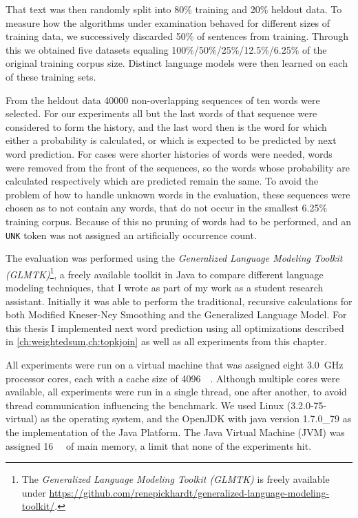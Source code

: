 That text was then randomly split into 80\% training and 20\% heldout data.
To measure how the algorithms under examination behaved for different sizes
of training data, we successively discarded 50\% of sentences from training.
Through this we obtained five datasets equaling 100\%/50\%/25\%/12.5\%/6.25\%
of the original training corpus size.
Distinct language models were then learned on each of these training sets.

From the heldout data \num{40000} non-overlapping sequences of ten words were
selected.
For our experiments all but the last words of that sequence were considered to
form the history, and the last word then is the word for which either a
probability is calculated, or which is expected to be predicted by next word prediction.
For cases were shorter histories of words were needed, words were removed from
the front of the sequences, so the words whose probability are calculated
respectively which are predicted remain the same.
To avoid the problem of how to handle unknown words in the evaluation, these
sequences were chosen as to not contain any words, that do not occur in
the smallest 6.25\% training corpus.
Because of this no pruning of words had to be performed, and an \texttt{UNK}
token was not assigned an artificially occurrence count.

The evaluation was performed using the \emph{Generalized Language Modeling
Toolkit (GLMTK)}\footnote{The \emph{Generalized Language Modeling Toolkit
(GLMTK)} is freely available under
\mbox{\url{https://github.com/renepickhardt/generalized-language-modeling-toolkit/}}.},
a freely available toolkit in Java to compare different language modeling
techniques, that I wrote as part of my work as a student research assistant.
Initially it was able to perform the traditional, recursive calculations for
both Modified Kneser-Ney Smoothing and the Generalized Language Model.
For this thesis I implemented next word prediction using all optimizations
described in \cref{ch:weightedsum,ch:topkjoin} as well as all experiments from
this chapter.

All experiments were run on a virtual machine that was assigned eight
\SI{3.0}{\giga\hertz} processor cores, each with a cache size of
\SI{4096}{\kibi\byte}.
Although multiple cores were available, all experiments were run in a single
thread, one after another, to avoid thread communication influencing the
benchmark.
We used Linux (3.2.0-75-virtual) as the operating system, and
the OpenJDK with java version 1.7.0\_79 as the implementation of the
Java Platform.
The Java Virtual Machine (JVM) was assigned \SI{16}{\gibi\byte} of main memory,
a limit that none of the experiments hit.

